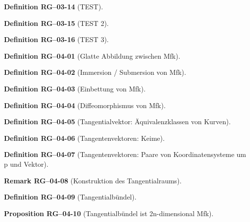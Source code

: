 \documentclass[10pt, letterpaper]{article}
\newcommand{\CustomHeading}[3]{%
  \par\medskip\noindent%
  \textbf{#1 #2} \textnormal{(#3)}.\enskip%
}
\newenvironment{DEF}[2]{\CustomHeading{Definition}{#1}{#2}}{}
\newenvironment{PROP}[2]{\CustomHeading{Proposition}{#1}{#2}}{}
\newenvironment{REM}[2]{\CustomHeading{Remark}{#1}{#2}}{}
\begin{document}
\begin{DEF}{RG--03-14}{TEST}
\end{DEF}

\begin{DEF}{RG--03-15}{TEST 2}
\end{DEF}

\begin{DEF}{RG--03-16}{TEST 3}
\end{DEF}

\begin{DEF}{RG--04-01}{Glatte Abbildung zwischen Mfk}
\end{DEF}

\begin{DEF}{RG--04-02}{Immersion / Submersion von Mfk}
\end{DEF}

\begin{DEF}{RG--04-03}{Einbettung von Mfk}
\end{DEF}

\begin{DEF}{RG--04-04}{Diffeomorphismus von Mfk}
\end{DEF}

\begin{DEF}{RG--04-05}{Tangentialvektor: Äquivalenzklassen von Kurven}
\end{DEF}

\begin{DEF}{RG--04-06}{Tangentenvektoren: Keime}
\end{DEF}

\begin{DEF}{RG--04-07}{Tangentenvektoren: Paare von Koordinatensysteme um p und Vektor}
\end{DEF}

\begin{REM}{RG--04-08}{Konstruktion des Tangentialraums}
\end{REM}

\begin{DEF}{RG--04-09}{Tangentialbündel}
\end{DEF}

\begin{PROP}{RG--04-10}{Tangentialbündel ist 2n-dimensional Mfk}
\end{PROP}
\end{document}
